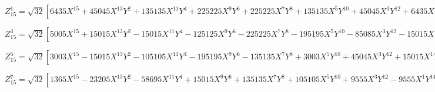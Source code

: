 \documentclass[10pt,landscape]{article}
\begin{document}
\vspace{1.2 mm}
\noindent $ Z^{1}_{15} = \sqrt{32} [6435X^{15} +45045X^{13}Y^{2} +135135X^{11}Y^{4} +225225X^{9}Y^{6} +225225X^{7}Y^{8} +135135X^{5}Y^{10} +45045X^{3}Y^{12} +6435X^{1}Y^{14} -24024X^{13} -144144X^{11}Y^{2} -360360X^{9}Y^{4} -480480X^{7}Y^{6} -360360X^{5}Y^{8} -144144X^{3}Y^{10} -24024X^{1}Y^{12} +36036X^{11} +180180X^{9}Y^{2} +360360X^{7}Y^{4} +360360X^{5}Y^{6} +180180X^{3}Y^{8} +36036X^{1}Y^{10} -27720X^{9} -110880X^{7}Y^{2} -166320X^{5}Y^{4} -110880X^{3}Y^{6} -27720X^{1}Y^{8} +11550X^{7} +34650X^{5}Y^{2} +34650X^{3}Y^{4} +11550X^{1}Y^{6} -2520X^{5} -5040X^{3}Y^{2} -2520X^{1}Y^{4} +252X^{3} +252X^{1}Y^{2} -8X^{1}] $

\vspace{1.2 mm}
\noindent $ Z^{3}_{15} = \sqrt{32} [5005X^{15} +15015X^{13}Y^{2} -15015X^{11}Y^{4} -125125X^{9}Y^{6} -225225X^{7}Y^{8} -195195X^{5}Y^{10} -85085X^{3}Y^{12} -15015X^{1}Y^{14} -18018X^{13} -36036X^{11}Y^{2} +90090X^{9}Y^{4} +360360X^{7}Y^{6} +450450X^{5}Y^{8} +252252X^{3}Y^{10} +54054X^{1}Y^{12} +25740X^{11} +25740X^{9}Y^{2} -154440X^{7}Y^{4} -360360X^{5}Y^{6} -283140X^{3}Y^{8} -77220X^{1}Y^{10} -18480X^{9} +110880X^{5}Y^{4} +147840X^{3}Y^{6} +55440X^{1}Y^{8} +6930X^{7} -6930X^{5}Y^{2} -34650X^{3}Y^{4} -20790X^{1}Y^{6} -1260X^{5} +2520X^{3}Y^{2} +3780X^{1}Y^{4} +84X^{3} -252X^{1}Y^{2}] $

\vspace{1.2 mm}
\noindent $ Z^{5}_{15} = \sqrt{32} [3003X^{15} -15015X^{13}Y^{2} -105105X^{11}Y^{4} -195195X^{9}Y^{6} -135135X^{7}Y^{8} +3003X^{5}Y^{10} +45045X^{3}Y^{12} +15015X^{1}Y^{14} -10010X^{13} +60060X^{11}Y^{2} +290290X^{9}Y^{4} +360360X^{7}Y^{6} +90090X^{5}Y^{8} -100100X^{3}Y^{10} -50050X^{1}Y^{12} +12870X^{11} -90090X^{9}Y^{2} -283140X^{7}Y^{4} -180180X^{5}Y^{6} +64350X^{3}Y^{8} +64350X^{1}Y^{10} -7920X^{9} +63360X^{7}Y^{2} +110880X^{5}Y^{4} -39600X^{1}Y^{8} +2310X^{7} -20790X^{5}Y^{2} -11550X^{3}Y^{4} +11550X^{1}Y^{6} -252X^{5} +2520X^{3}Y^{2} -1260X^{1}Y^{4}] $

\vspace{1.2 mm}
\noindent $ Z^{7}_{15} = \sqrt{32} [1365X^{15} -23205X^{13}Y^{2} -58695X^{11}Y^{4} +15015X^{9}Y^{6} +135135X^{7}Y^{8} +105105X^{5}Y^{10} +9555X^{3}Y^{12} -9555X^{1}Y^{14} -4004X^{13} +72072X^{11}Y^{2} +100100X^{9}Y^{4} -144144X^{7}Y^{6} -252252X^{5}Y^{8} -56056X^{3}Y^{10} +28028X^{1}Y^{12} +4290X^{11} -81510X^{9}Y^{2} -25740X^{7}Y^{4} +180180X^{5}Y^{6} +90090X^{3}Y^{8} -30030X^{1}Y^{10} -1980X^{9} +39600X^{7}Y^{2} -27720X^{5}Y^{4} -55440X^{3}Y^{6} +13860X^{1}Y^{8} +330X^{7} -6930X^{5}Y^{2} +11550X^{3}Y^{4} -2310X^{1}Y^{6}] $
\end{document}
